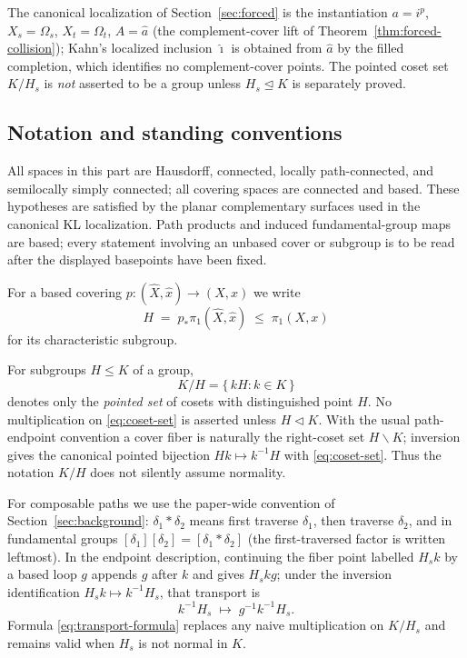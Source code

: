 \documentclass[11pt,reqno]{amsart}
\theoremstyle{definition}
\theoremstyle{remark}
\begin{document}
The canonical
localization of Section~\ref{sec:forced} is the instantiation
$a=i^{p}$, $X_{s}=\Omega_{s}$, $X_{t}=\Omega_{t}$, $A=\widehat a$ (the
complement-cover lift of Theorem~\ref{thm:forced-collision}); Kahn's
localized inclusion $\widehat\imath$ is obtained from $\widehat a$ by
the filled completion, which identifies no complement-cover points.
The pointed
coset set $K/H_{s}$ is \emph{not} asserted to be a group unless
$H_{s}\trianglelefteq K$ is separately proved.

\subsection*{Notation and standing conventions}

All spaces in this part are Hausdorff, connected, locally path-connected,
and semilocally simply connected; all covering spaces are connected and
based.  These hypotheses are satisfied by the planar complementary
surfaces used in the canonical KL localization.  Path products and
induced fundamental-group maps are based; every statement involving an
unbased cover or subgroup is to be read after the displayed basepoints
have been fixed.

For a based covering \( p\colon(\widehat X,\widehat x)\to(X,x) \) we write
\[
  H \;=\; p_*\pi_1(\widehat X,\widehat x)\;\leq\;\pi_1(X,x)
\]
for its characteristic subgroup.

For subgroups \( H\leq K \) of a group,
\begin{equation}\label{eq:coset-set}
  K/H=\{\,kH : k\in K\,\}
\end{equation}
denotes only the \emph{pointed set} of cosets with distinguished point
\( H \).  No multiplication on \eqref{eq:coset-set} is asserted unless
\( H\triangleleft K \).  With the usual path-endpoint convention a cover
fiber is naturally the right-coset set \( H\backslash K \); inversion
gives the canonical pointed bijection \( Hk\longmapsto k^{-1}H \) with
\eqref{eq:coset-set}.  Thus the notation \( K/H \) does not silently
assume normality.

For composable paths we use the paper-wide convention of
Section~\ref{sec:background}: \( \delta_1*\delta_2 \) means first
traverse \( \delta_1 \), then traverse \( \delta_2 \), and in
fundamental groups \( [\delta_1][\delta_2]=[\delta_1*\delta_2] \)
(the first-traversed factor is written leftmost).  In the endpoint
description, continuing the fiber point labelled \( H_sk \) by a based
loop \( g \) appends \( g \) after \( k \) and gives \( H_skg \); under
the inversion identification
\( H_sk\mapsto k^{-1}H_s \), that transport is
\begin{equation}\label{eq:transport-formula}
  k^{-1}H_s\;\longmapsto\; g^{-1}k^{-1}H_s .
\end{equation}
Formula \eqref{eq:transport-formula} replaces any naive multiplication on
\( K/H_s \) and remains valid when \( H_s \) is not normal in \( K \).
\end{document}
